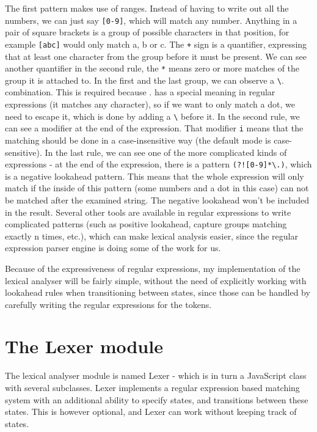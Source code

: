 The first pattern makes use of ranges. Instead of having to write out all the numbers, we can just say \texttt{[0-9]}, which will match any number. Anything in a pair of square brackets is a group of possible characters in that position, for example \texttt{[abc]} would only match a, b or c. The \texttt{+} sign is a quantifier, expressing that at least one character from the group before it must be present. We can see another quantifier in the second rule, the \texttt{*} means zero or more matches of the group it is attached to. In the first and the last group, we can observe a \texttt{\textbackslash}. combination. This is required because . has a special meaning in regular expressions (it matches any character), so if we want to only match a dot, we need to escape it, which is done by adding a \texttt{\textbackslash} before it. In the second rule, we can see a modifier at the end of the expression. That modifier \texttt{i} means that the matching should be done in a case-insensitive way (the default mode is case-sensitive). In the last rule, we can see one of the more complicated kinds of expressions - at the end of the expression, there is a pattern \texttt{(?![0-9]*\textbackslash.)}, which is a negative lookahead pattern. This means that the whole expression will only match if the inside of this pattern (some numbers and a dot in this case) can not be matched after the examined string. The negative lookahead won't be included in the result. Several other tools are available in regular expressions to write complicated patterns (such as positive lookahead, capture groups matching exactly n times, etc.), which can make lexical analysis easier, since the regular expression parser engine is doing some of the work for us.

Because of the expressiveness of regular expressions, my implementation of the lexical analyser will be fairly simple, without the need of explicitly working with lookahead rules when transitioning between states, since those can be handled by carefully writing the regular expressions for the tokens.
\section{The Lexer module}
The lexical analyser module is named Lexer - which is in turn a JavaScript class with several subclasses. Lexer implements a regular expression based matching system with an additional ability to specify states, and transitions between these states. This is however optional, and Lexer can work without keeping track of states.

